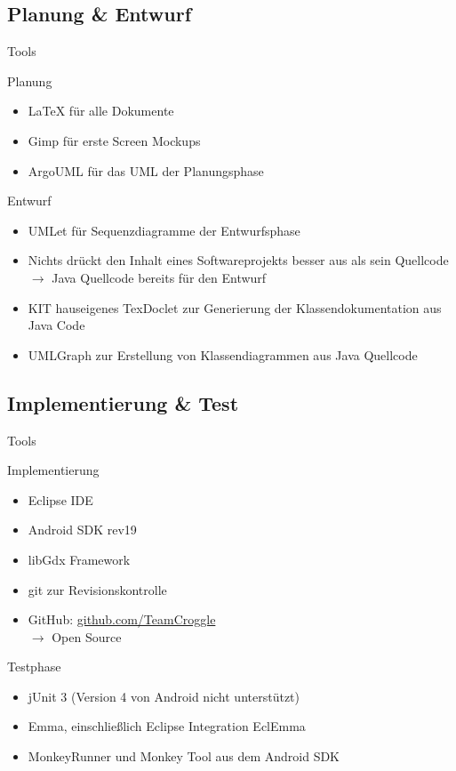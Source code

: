 \documentclass[18pt]{beamer}
\begin{document}
	\subsection{Planung \& Entwurf}
	\begin{frame}[<+->]{Tools}
		\begin{block}{Planung}
			\begin{itemize}
				\item LaTeX für alle Dokumente
				\item Gimp für erste Screen Mockups
				\item ArgoUML für das UML der Planungsphase
			\end{itemize}
		\end{block}
		\begin{block}{Entwurf}
			\begin{itemize}
				\item UMLet für Sequenzdiagramme der Entwurfsphase
				\item Nichts drückt den Inhalt eines Softwareprojekts besser aus als sein Quellcode \\
				$\rightarrow$ Java Quellcode bereits für den Entwurf
				\item KIT hauseigenes TexDoclet zur Generierung der Klassendokumentation aus Java Code
				\item UMLGraph zur Erstellung von Klassendiagrammen aus Java Quellcode
			\end{itemize}
		\end{block}
	\end{frame}

	\subsection{Implementierung \& Test}
	\begin{frame}[<+->]{Tools}
		\begin{block}{Implementierung}
			\begin{itemize}
				\item Eclipse IDE
				\item Android SDK rev19
				\item libGdx Framework
				\item git zur Revisionskontrolle
				\item GitHub: \textcolor{blue}{\href{http://github.com/TeamCroggle}{github.com/TeamCroggle}} \\
					$\rightarrow$ Open Source
			\end{itemize}
		\end{block}
		\begin{block}{Testphase}
			\begin{itemize}
				\item jUnit 3 (Version 4 von Android nicht unterstützt)
				\item Emma, einschließlich Eclipse Integration EclEmma
				\item MonkeyRunner und Monkey Tool aus dem Android SDK
			\end{itemize}
		\end{block}
	\end{frame}
	
\end{document}
